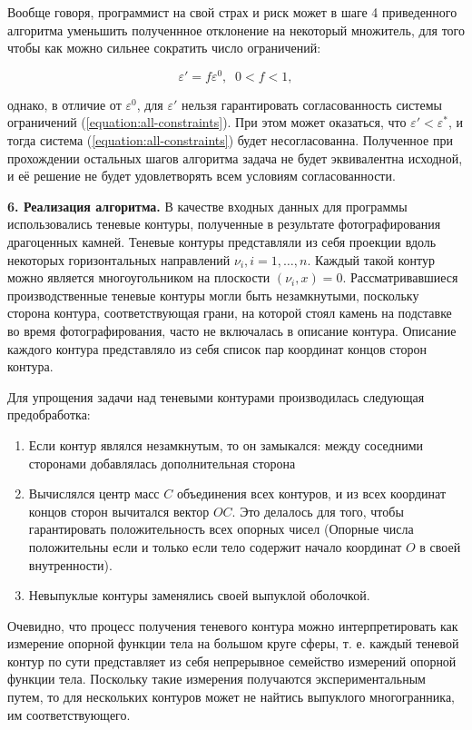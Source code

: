 \documentclass[a4paper, 10pt]{article}
\theoremstyle{definition}
\theoremstyle{plain}
\theoremstyle{plain}
\begin{document}
Вообще говоря, программист на свой страх и риск может в шаге 4 приведенного
алгоритма уменьшить полученнное отклонение на некоторый множитель, для того
чтобы как можно сильнее сократить число ограничений:

\begin{equation}
 \varepsilon' = f \varepsilon^{0}, \;\; 0 < f < 1,
\end{equation}

однако, в отличие от $\varepsilon^{0}$, для $\varepsilon'$ нельзя
гарантировать согласованность системы ограничений
(\ref{equation:all-constraints}). При этом может оказаться, что
$\varepsilon' < \varepsilon^{*}$, и тогда система
(\ref{equation:all-constraints}) будет несогласованна. Полученное при
прохождении остальных шагов алгоритма задача не будет эквивалентна
исходной, и её решение не будет удовлетворять всем условиям согласованности.

\textbf{6. Реализация алгоритма.} В качестве входных данных для программы
использовались теневые контуры, полученные в результате фотографирования
драгоценных камней. Теневые контуры представляли из себя проекции вдоль
некоторых горизонтальных направлений $\nu_{i}, i = 1, \ldots, n$. Каждый такой
контур можно является многоугольником на плоскости $(\nu_{i}, x) = 0$.
Рассматривавшиеся производственные теневые контуры могли быть незамкнутыми,
поскольку сторона контура, соответствующая грани, на которой стоял камень на
подставке во время фотографирования, часто не включалась в описание контура.
Описание каждого контура представляло из себя список пар координат концов сторон
контура.

Для упрощения задачи над теневыми контурами производилась следующая
предобработка:

\begin{enumerate}
 \item Если контур являлся незамкнутым, то он замыкался: между соседними
 сторонами добавлялась дополнительная сторона
 \item Вычислялся центр масс $C$ объединения всех контуров, и из всех координат
 концов сторон вычитался вектор $OC$. Это делалось для того, чтобы гарантировать
 положительность всех опорных чисел (Опорные числа положительны если и только
 если тело содержит начало координат $O$ в своей внутренности).
 \item Невыпуклые контуры заменялись своей выпуклой оболочкой.
\end{enumerate}

Очевидно, что процесс получения теневого контура можно интерпретировать как
измерение опорной функции тела на большом круге сферы, т. е. каждый теневой
контур по сути представляет из себя непрерывное семейство измерений опорной
функции тела. Поскольку такие измерения получаются экспериментальным путем, то
для нескольких контуров может не найтись выпуклого многогранника, им
соответствующего.
\end{document}
